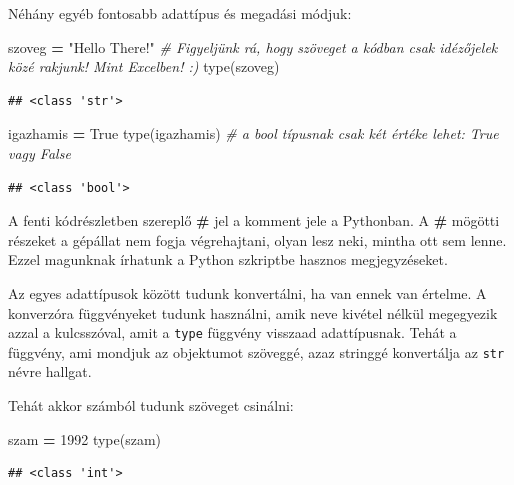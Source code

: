 \documentclass[
]{book}
\newenvironment{Shaded}{\begin{snugshade}}{\end{snugshade}}
\newcommand{\BuiltInTok}[1]{#1}
\newcommand{\CommentTok}[1]{\textcolor[rgb]{0.56,0.35,0.01}{\textit{#1}}}
\newcommand{\DecValTok}[1]{\textcolor[rgb]{0.00,0.00,0.81}{#1}}
\newcommand{\NormalTok}[1]{#1}
\newcommand{\OperatorTok}[1]{\textcolor[rgb]{0.81,0.36,0.00}{\textbf{#1}}}
\newcommand{\StringTok}[1]{\textcolor[rgb]{0.31,0.60,0.02}{#1}}
\newcommand{\VariableTok}[1]{\textcolor[rgb]{0.00,0.00,0.00}{#1}}
\begin{document}
Néhány egyéb fontosabb adattípus és megadási módjuk:

\begin{Shaded}
\begin{Highlighting}[]
\NormalTok{szoveg }\OperatorTok{=} \StringTok{"Hello There!"} \CommentTok{\# Figyeljünk rá, hogy szöveget a kódban csak idézőjelek közé rakjunk! Mint Excelben! :)}
\BuiltInTok{type}\NormalTok{(szoveg)}
\end{Highlighting}
\end{Shaded}

\begin{verbatim}
## <class 'str'>
\end{verbatim}

\begin{Shaded}
\begin{Highlighting}[]
\NormalTok{igazhamis }\OperatorTok{=} \VariableTok{True}
\BuiltInTok{type}\NormalTok{(igazhamis) }\CommentTok{\# a bool típusnak csak két értéke lehet: True vagy False}
\end{Highlighting}
\end{Shaded}

\begin{verbatim}
## <class 'bool'>
\end{verbatim}

A fenti kódrészletben szereplő \textbf{\#} jel a komment jele a Pythonban. A \textbf{\#} mögötti részeket a gépállat nem fogja végrehajtani, olyan lesz neki, mintha ott sem lenne. Ezzel magunknak írhatunk a Python szkriptbe hasznos megjegyzéseket.

Az egyes adattípusok között tudunk konvertálni, ha van ennek van értelme. A konverzóra függvényeket tudunk használni, amik neve kivétel nélkül megegyezik azzal a kulcsszóval, amit a \texttt{type} függvény visszaad adattípusnak. Tehát a függvény, ami mondjuk az objektumot szöveggé, azaz stringgé konvertálja az \texttt{str} névre hallgat.

Tehát akkor számból tudunk szöveget csinálni:

\begin{Shaded}
\begin{Highlighting}[]
\NormalTok{szam }\OperatorTok{=} \DecValTok{1992}
\BuiltInTok{type}\NormalTok{(szam)}
\end{Highlighting}
\end{Shaded}

\begin{verbatim}
## <class 'int'>
\end{verbatim}
\end{document}
